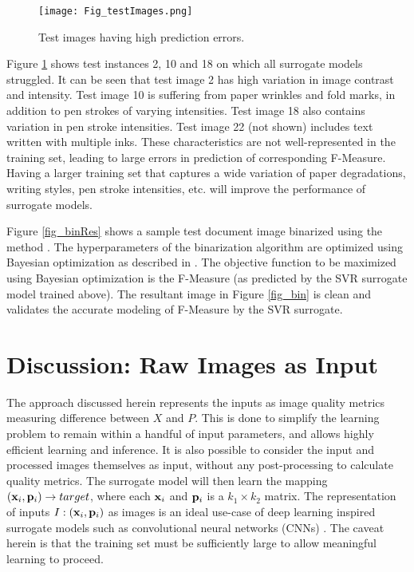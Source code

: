 \documentclass[10pt, a4paper, conference, compsocconf]{IEEEtran}
\begin{document}
\begin{figure}[!t]
\centering
\texttt{[image: Fig\_testImages.png]}
\caption{Test images having high prediction errors.}
\label{fig_testImages}
\end{figure}

Figure \ref{fig_testImages} shows test instances 2, 10 and 18 on which all surrogate models struggled. It can be seen that test image 2 has high variation in image contrast and intensity. Test image 10 is suffering from paper wrinkles and fold marks, in addition to pen strokes of varying intensities. Test image 18 also contains variation in pen stroke intensities. Test image 22 (not shown) includes text written with multiple inks. These characteristics are not well-represented in the training set, leading to large errors in prediction of corresponding F-Measure. Having a larger training set that captures a wide variation of paper degradations, writing styles, pen stroke intensities, etc. will improve the performance of surrogate models.


Figure \ref{fig_binRes} shows a sample test document image binarized using the method \cite{vats2017automatic}. The hyperparameters of the binarization algorithm are optimized using Bayesian optimization \cite{snoek2012practical} as described in \cite{vats2017automatic}. The objective function to be maximized using Bayesian optimization is the F-Measure (as predicted by the SVR surrogate model trained above). The resultant image in Figure \ref{fig_bin} is clean and validates the accurate modeling of F-Measure by the SVR surrogate.









\section{Discussion: Raw Images as Input}
\label{sec:discussion}
The approach discussed herein represents the inputs as image quality metrics measuring difference between $X$ and $P$. This is done to simplify the learning problem to remain within a handful of input parameters, and allows highly efficient learning and inference.
It is also possible to consider the input and processed images themselves as input, without any post-processing to calculate quality metrics. The surrogate model will then learn the mapping $({\bf x}_i, {\bf p}_i) \rightarrow target$, where each ${\bf x}_i$ and ${\bf p}_i$ is a $k_1 \times k_2$ matrix. The representation of inputs $I: ({\bf x}_i, {\bf p}_i)$ as images is an ideal use-case of deep learning inspired surrogate models such as convolutional neural networks (CNNs) \cite{krizhevsky2012imagenet}. The caveat herein is that the training set must be sufficiently large to allow meaningful learning to proceed.
\end{document}
